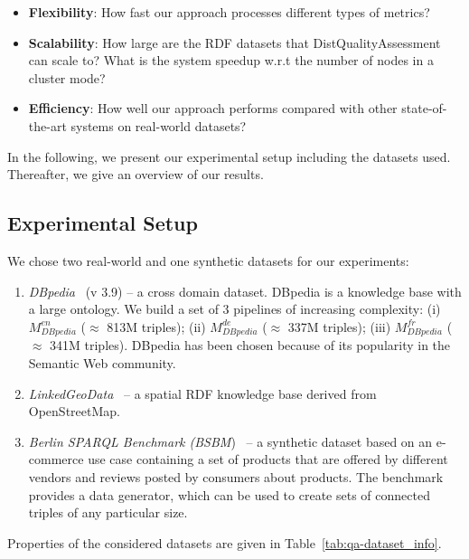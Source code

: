 \begin{itemize}
    \item \textbf{Flexibility}: How fast our approach processes different types of metrics?
    \item \textbf{Scalability}: How large are the RDF datasets that DistQualityAssessment can scale to? 
    What is the system speedup w.r.t the number of nodes in a cluster mode?
    \item \textbf{Efficiency}: How well our approach performs compared with other state-of-the-art systems on real-world datasets?
\end{itemize}
In the following, we present our experimental setup including the datasets used. 
Thereafter, we give an overview of our results.

\subsection{Experimental Setup}

We chose two real-world and one synthetic datasets for our experiments:
 \begin{enumerate}
 \item \emph{DBpedia}~\cite{dbpedia-swj} (v 3.9) -- a cross domain dataset.
 DBpedia is a knowledge base with a large ontology.
 We build a set of 3 pipelines of increasing complexity: (i) $M_{DBpedia}^{en}$ ($\approx$ 813M triples); (ii) $M_{DBpedia}^{de}$ ($\approx$ 337M triples); (iii) $M_{DBpedia}^{fr}$ ($\approx$ 341M triples). 
DBpedia has been chosen because of its popularity in the Semantic Web community.
\item \emph{LinkedGeoData}~\cite{SLHA11} -- a spatial RDF knowledge base derived from OpenStreetMap.
\item \emph{Berlin SPARQL Benchmark (BSBM})~\cite{Bizer2009TheBS}  -- a synthetic dataset based on an e-commerce use case containing a set of products that are offered by different vendors and reviews posted by consumers about products.
The benchmark provides a data generator, which can be used to create sets of connected triples of any particular size.
 \end{enumerate}
Properties of the considered datasets are given in Table~\ref{tab:qa-dataset_info}.

